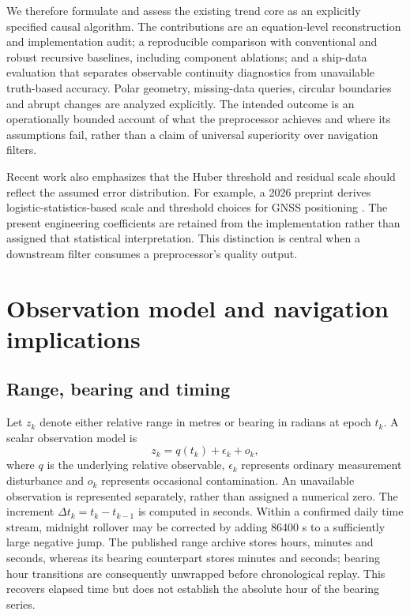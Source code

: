 \documentclass[12pt,a4paper]{article}
\begin{document}
We therefore formulate and assess the existing trend core as an explicitly specified causal algorithm. The contributions are an equation-level reconstruction and implementation audit; a reproducible comparison with conventional and robust recursive baselines, including component ablations; and a ship-data evaluation that separates observable continuity diagnostics from unavailable truth-based accuracy. Polar geometry, missing-data queries, circular boundaries and abrupt changes are analyzed explicitly. The intended outcome is an operationally bounded account of what the preprocessor achieves and where its assumptions fail, rather than a claim of universal superiority over navigation filters.

Recent work also emphasizes that the Huber threshold and residual scale should reflect the assumed error distribution. For example, a 2026 preprint derives logistic-statistics-based scale and threshold choices for GNSS positioning \cite{li}. The present engineering coefficients are retained from the implementation rather than assigned that statistical interpretation. This distinction is central when a downstream filter consumes a preprocessor's quality output.

\section{Observation model and navigation implications}
\subsection{Range, bearing and timing}
Let $z_k$ denote either relative range in metres or bearing in radians at epoch $t_k$. A scalar observation model is
\begin{equation}
 z_k=q(t_k)+\epsilon_k+o_k,
 \label{eq:obs}
\end{equation}
where $q$ is the underlying relative observable, $\epsilon_k$ represents ordinary measurement disturbance and $o_k$ represents occasional contamination. An unavailable observation is represented separately, rather than assigned a numerical zero. The increment $\Delta t_k=t_k-t_{k-1}$ is computed in seconds. Within a confirmed daily time stream, midnight rollover may be corrected by adding 86400 s to a sufficiently large negative jump. The published range archive stores hours, minutes and seconds, whereas its bearing counterpart stores minutes and seconds; bearing hour transitions are consequently unwrapped before chronological replay. This recovers elapsed time but does not establish the absolute hour of the bearing series.
\end{document}

